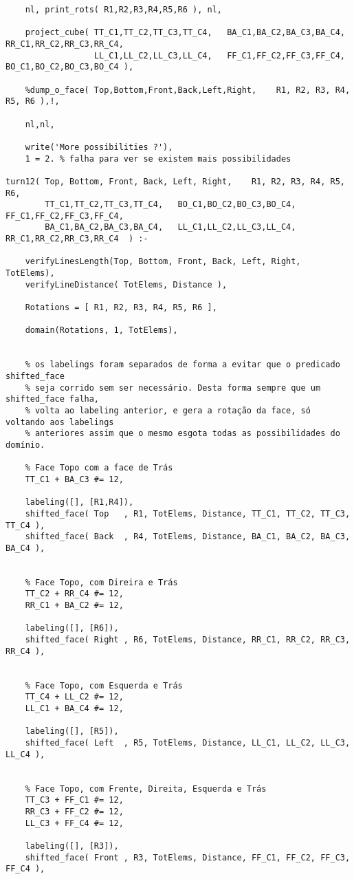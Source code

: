 \begin{lstlisting}
	nl,	print_rots( R1,R2,R3,R4,R5,R6 ), nl,
	
	project_cube( TT_C1,TT_C2,TT_C3,TT_C4,   BA_C1,BA_C2,BA_C3,BA_C4,   RR_C1,RR_C2,RR_C3,RR_C4,
                  LL_C1,LL_C2,LL_C3,LL_C4,   FF_C1,FF_C2,FF_C3,FF_C4,   BO_C1,BO_C2,BO_C3,BO_C4 ),
				  
	%dump_o_face( Top,Bottom,Front,Back,Left,Right,    R1, R2, R3, R4, R5, R6 ),!,
	
	nl,nl,

	write('More possibilities ?'),
	1 = 2. % falha para ver se existem mais possibilidades

turn12( Top, Bottom, Front, Back, Left, Right,    R1, R2, R3, R4, R5, R6,
		TT_C1,TT_C2,TT_C3,TT_C4,   BO_C1,BO_C2,BO_C3,BO_C4,    FF_C1,FF_C2,FF_C3,FF_C4,
		BA_C1,BA_C2,BA_C3,BA_C4,   LL_C1,LL_C2,LL_C3,LL_C4,    RR_C1,RR_C2,RR_C3,RR_C4  ) :-
	
	verifyLinesLength(Top, Bottom, Front, Back, Left, Right, TotElems),
	verifyLineDistance( TotElems, Distance ),

	Rotations = [ R1, R2, R3, R4, R5, R6 ],

	domain(Rotations, 1, TotElems),

	
	% os labelings foram separados de forma a evitar que o predicado shifted_face
	% seja corrido sem ser necessário. Desta forma sempre que um shifted_face falha,
	% volta ao labeling anterior, e gera a rotação da face, só voltando aos labelings
	% anteriores assim que o mesmo esgota todas as possibilidades do domínio.
	
	% Face Topo com a face de Trás
	TT_C1 + BA_C3 #= 12,
	
	labeling([], [R1,R4]),
	shifted_face( Top   , R1, TotElems, Distance, TT_C1, TT_C2, TT_C3, TT_C4 ),
	shifted_face( Back  , R4, TotElems, Distance, BA_C1, BA_C2, BA_C3, BA_C4 ),
	
	
	% Face Topo, com Direira e Trás 
	TT_C2 + RR_C4 #= 12,
	RR_C1 + BA_C2 #= 12,
	
	labeling([], [R6]),
	shifted_face( Right , R6, TotElems, Distance, RR_C1, RR_C2, RR_C3, RR_C4 ),
	

	% Face Topo, com Esquerda e Trás
	TT_C4 + LL_C2 #= 12,
	LL_C1 + BA_C4 #= 12,
	
	labeling([], [R5]),
	shifted_face( Left  , R5, TotElems, Distance, LL_C1, LL_C2, LL_C3, LL_C4 ),

	
	% Face Topo, com Frente, Direita, Esquerda e Trás
	TT_C3 + FF_C1 #= 12,
	RR_C3 + FF_C2 #= 12,
	LL_C3 + FF_C4 #= 12,
	
	labeling([], [R3]),
	shifted_face( Front , R3, TotElems, Distance, FF_C1, FF_C2, FF_C3, FF_C4 ),



\end{lstlisting}
